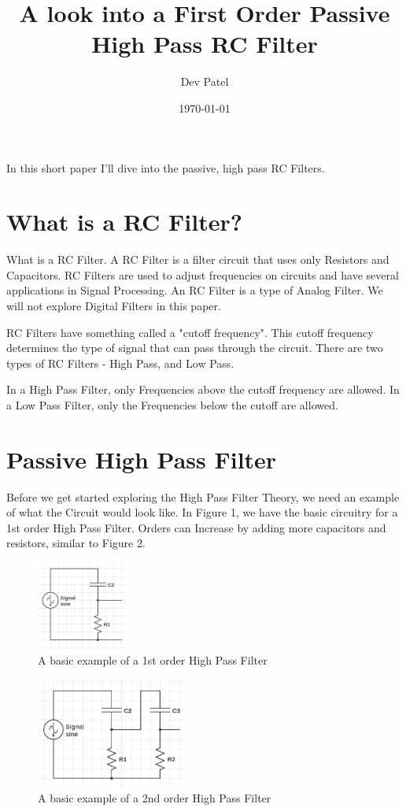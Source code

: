 \documentclass[letterpaper,12pt]{article}
\begin{document}
\title{A look into a First Order Passive High Pass RC Filter}
\author{Dev Patel}
\date{\today}
\maketitle


In this short paper I'll dive into the passive, high pass RC Filters.



\section{What is a RC Filter?}

What is a RC Filter. A RC Filter is a filter circuit that uses only Resistors and Capacitors. RC Filters are used to adjust frequencies on circuits and have several applications in Signal Processing. An RC Filter is a type of Analog Filter. We will not explore Digital Filters in this paper.

RC Filters have something called a "cutoff frequency". This cutoff frequency determines the type of signal that can pass through the circuit. There are two types of RC Filters - High Pass, and Low Pass.

In a High Pass Filter, only Frequencies above the cutoff frequency are allowed. In a Low Pass Filter, only the Frequencies below the cutoff are allowed.

\section{ Passive High Pass Filter}

Before we get started exploring the High Pass Filter Theory, we need an example of what the Circuit would look like. In Figure 1, we have the basic circuitry for a 1st order High Pass Filter. Orders can Increase by adding more capacitors and resistors, similar to Figure 2.

\begin{figure}
    \centering
    \includegraphics[width=30mm,scale=0.5]{highpassorder1.png}
    \caption{A basic example of a 1st order High Pass Filter}
\end{figure}
\begin{figure}
    \centering
    \includegraphics[width=50mm,scale=0.5]{highpassorder2.png}
    \caption{A basic example of a 2nd order High Pass Filter}
\end{figure}
\end{document}
